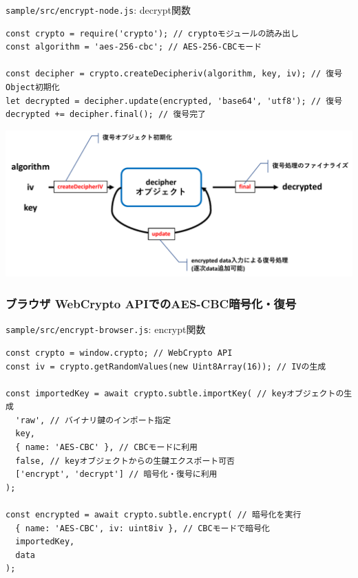 \documentclass[12pt,dvipdfmx]{beamer}
\begin{document}
\begin{frame}[fragile]
\scriptsize
\begin{block}{\small \texttt{sample/src/encrypt-node.js}: decrypt関数}
\begin{verbatim}
const crypto = require('crypto'); // cryptoモジュールの読み出し
const algorithm = 'aes-256-cbc'; // AES-256-CBCモード

const decipher = crypto.createDecipheriv(algorithm, key, iv); // 復号Object初期化
let decrypted = decipher.update(encrypted, 'base64', 'utf8'); // 復号
decrypted += decipher.final(); // 復号完了
\end{verbatim}
\end{block}
\begin{center}
\includegraphics[width=0.8\linewidth]{Figs/node_aes_d.pdf}
\end{center}
\end{frame}


\begin{frame}[fragile]
\frametitle{ブラウザ WebCrypto APIでのAES-CBC暗号化・復号}

\begin{block}{\small \texttt{sample/src/encrypt-browser.js}: encrypt関数}
\scriptsize
\begin{verbatim}
const crypto = window.crypto; // WebCrypto API
const iv = crypto.getRandomValues(new Uint8Array(16)); // IVの生成

const importedKey = await crypto.subtle.importKey( // keyオブジェクトの生成
  'raw', // バイナリ鍵のインポート指定
  key,
  { name: 'AES-CBC' }, // CBCモードに利用
  false, // keyオブジェクトからの生鍵エクスポート可否
  ['encrypt', 'decrypt'] // 暗号化・復号に利用
);

const encrypted = await crypto.subtle.encrypt( // 暗号化を実行
  { name: 'AES-CBC', iv: uint8iv }, // CBCモードで暗号化
  importedKey,
  data
);
\end{verbatim}
\end{block}
\end{frame}
\end{document}

